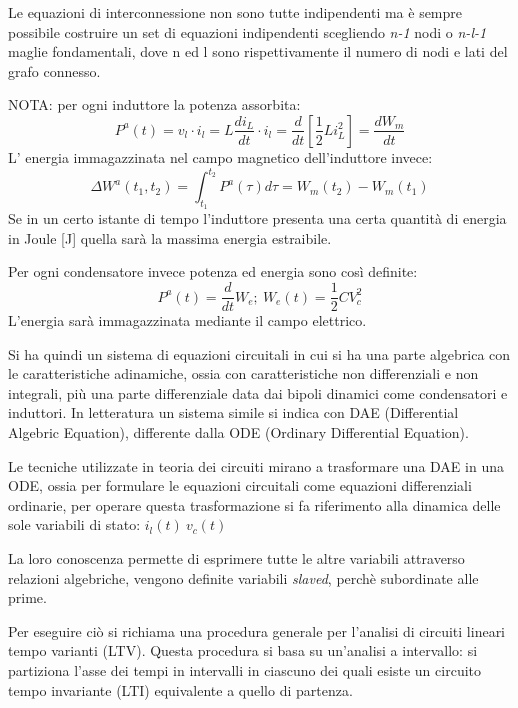Le equazioni di interconnessione non sono tutte indipendenti ma è sempre possibile
costruire un set di equazioni indipendenti scegliendo \textit{n-1} nodi o \textit{n-l-1} maglie fondamentali,
dove n ed l sono rispettivamente il numero di nodi e lati del grafo connesso.

NOTA: per ogni induttore la potenza assorbita:
$$ P^a(t) = v_l\cdot i_l = L \frac{di_L}{dt}\cdot i_l = \frac{d}{dt} [\frac{1}{2}Li_L^2] = \frac{dW_m}{dt} $$ 
L' energia immagazzinata nel campo magnetico dell'induttore invece:
$$\Delta W^a(t_1,t_2) = \int_{t_1}^{t_2} P^a(\tau)d\tau = W_m (t_2) - W_m(t_1) $$
Se in un certo istante di tempo l'induttore presenta una certa quantità di energia in Joule [\si{\joule}] quella sarà la massima energia estraibile.

Per ogni condensatore invece potenza ed energia sono così definite:
$$P^a(t) = \frac{d}{dt} W_e;\ W_e(t) = \frac{1}{2} CV_c^2$$
L'energia sarà immagazzinata mediante il campo elettrico.

Si ha quindi un sistema di equazioni circuitali in cui si ha una parte algebrica con le caratteristiche adinamiche, ossia con caratteristiche
non differenziali e non integrali, più una parte differenziale data dai bipoli dinamici come condensatori e induttori.
In letteratura un sistema simile si indica con DAE (Differential Algebric Equation), differente
dalla ODE (Ordinary Differential Equation).

Le tecniche utilizzate in teoria dei circuiti mirano a trasformare una DAE in una ODE, ossia 
per formulare le equazioni circuitali come equazioni differenziali ordinarie, per operare questa trasformazione si fa riferimento
alla dinamica delle sole {variabili di stato}: $i_l(t)\ v_c(t)$

La loro conoscenza permette di esprimere tutte le altre variabili attraverso relazioni algebriche, vengono definite
variabili \textit{slaved}, perchè subordinate alle prime.

Per eseguire ciò si richiama una procedura generale per l'analisi di circuiti lineari tempo varianti (LTV).
Questa procedura si basa su un'analisi a intervallo: si partiziona l'asse dei tempi in intervalli in ciascuno dei quali esiste un circuito 
tempo invariante (LTI) equivalente a quello di partenza.

